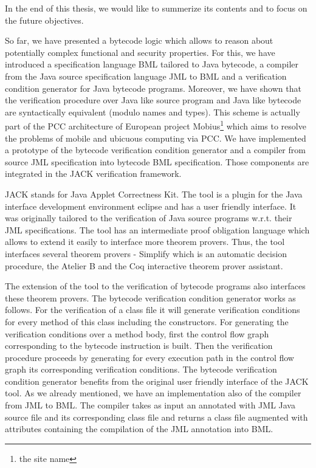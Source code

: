 
In the end of this thesis, we would like to summerize 
its contents and to focus on the future objectives. 

So far, we have  presented a bytecode logic which allows to reason about potentially
complex  functional and security properties.
 For this, we have 
introduced a specification language BML tailored to Java bytecode, a compiler
from the Java source specification language JML to BML and a verification 
condition generator for Java bytecode programs. Moreover, we have
shown that the verification procedure over Java like source program
and Java like bytecode are syntactically equivalent (modulo names and types). 
This scheme is actually part of the PCC architecture of 
European project Mobius\footnote{the site name} which aims to resolve the problems
of mobile and ubicuous computing via PCC. 
We have implemented a prototype of the bytecode verification condition generator and a compiler 
from source JML specification into bytecode BML specification. Those components are integrated in the JACK verification framework. 

JACK stands for Java Applet Correctness Kit. The tool is a plugin for the Java interface development
 environment eclipse and has a user friendly interface. It was originally tailored to the verification of Java source programs 
w.r.t. their JML specifications. The tool has an intermediate proof obligation language which allows to extend it easily to interface more 
 theorem provers. Thus, the tool interfaces several theorem provers - Simplify
 which is an automatic decision procedure, the Atelier B and the Coq
 interactive theorem prover assistant. 


The extension of the tool to  the verification of bytecode programs also interfaces these theorem provers. The bytecode 
verification condition generator works as follows. For the verification of a class file it will generate verification conditions for every
 method of this class including the constructors. For generating the verification conditions over a method body, first the control flow
 graph corresponding to the bytecode instruction is built.
 Then the verification procedure proceeds by generating for every execution path in the control flow graph its corresponding verification conditions.
The bytecode verification condition generator benefits from the original user friendly interface of the JACK tool. 
As we already mentioned, we have an implementation also of the compiler from
JML to BML. The compiler takes as input an annotated with JML Java source file
and its corresponding class file and returns a class file augmented with
attributes containing the compilation of the JML annotation into BML.

